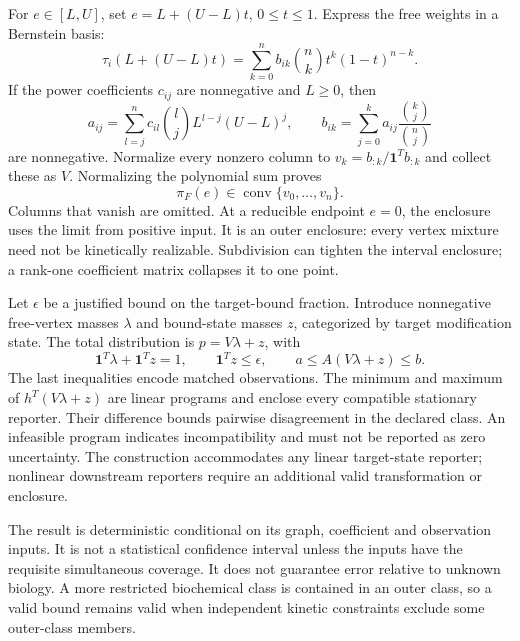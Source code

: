 \documentclass[11pt]{article}
\begin{document}
For $e\in[L,U]$, set $e=L+(U-L)t$, $0\leq t\leq1$. Express the free weights in a Bernstein basis:
\begin{equation}
 \tau_i(L+(U-L)t)=\sum_{k=0}^n b_{ik}{n\choose k}t^k(1-t)^{n-k}.
\end{equation}
If the power coefficients $c_{ij}$ are nonnegative and $L\geq0$, then
\begin{equation}
 a_{ij}=\sum_{l=j}^n c_{il}{l\choose j}L^{l-j}(U-L)^j,
 \qquad b_{ik}=\sum_{j=0}^k a_{ij}\frac{{k\choose j}}{{n\choose j}}
\end{equation}
are nonnegative. Normalize every nonzero column to $v_k=b_{:k}/\mathbf1^Tb_{:k}$ and collect these as $V$. Normalizing the polynomial sum proves
\begin{equation}
 \pi_F(e)\in\operatorname{conv}\{v_0,\ldots,v_n\}.
\end{equation}
Columns that vanish are omitted. At a reducible endpoint $e=0$, the enclosure uses the limit from positive input. It is an outer enclosure: every vertex mixture need not be kinetically realizable. Subdivision can tighten the interval enclosure; a rank-one coefficient matrix collapses it to one point.

Let $\epsilon$ be a justified bound on the target-bound fraction. Introduce nonnegative free-vertex masses $\lambda$ and bound-state masses $z$, categorized by target modification state. The total distribution is $p=V\lambda+z$, with
\begin{equation}
 \mathbf1^T\lambda+\mathbf1^Tz=1,\qquad \mathbf1^Tz\leq\epsilon,
 \qquad a\leq A(V\lambda+z)\leq b.
\end{equation}
The last inequalities encode matched observations. The minimum and maximum of $h^T(V\lambda+z)$ are linear programs and enclose every compatible stationary reporter. Their difference bounds pairwise disagreement in the declared class. An infeasible program indicates incompatibility and must not be reported as zero uncertainty. The construction accommodates any linear target-state reporter; nonlinear downstream reporters require an additional valid transformation or enclosure.

The result is deterministic conditional on its graph, coefficient and observation inputs. It is not a statistical confidence interval unless the inputs have the requisite simultaneous coverage. It does not guarantee error relative to unknown biology. A more restricted biochemical class is contained in an outer class, so a valid bound remains valid when independent kinetic constraints exclude some outer-class members.
\end{document}

